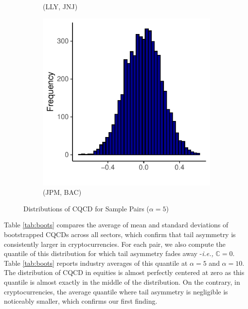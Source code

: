 \documentclass{article}
\begin{document}
\begin{figure}[H]
\begin{subfigure}[b]{0.3\textwidth}
        \caption{(LLY, JNJ)}
        \label{fig:boot-sub2}
    \end{subfigure}
    \begin{subfigure}[b]{0.3\textwidth}
        \includegraphics[width=\textwidth]{Figures/hist_JPM_BAC.pdf}
        \caption{(JPM, BAC)}
        \label{fig:boot-sub3}
    \end{subfigure}
    \caption{Distributions of CQCD  for Sample Pairs ($\alpha =5$)}
    \label{fig:cqds:boot}
\end{figure}



 Table \ref{tab:boots} compares the average of mean and standard deviations of bootstrapped CQCDs across all sectors, which confirm that tail asymmetry is consistently larger in cryptocurrencies. For each pair, we also compute the quantile of this distribution for which tail asymmetry fades away -\textit{i.e.,} $\mathbb{C} = 0$. Table \ref{tab:boots} reports industry averages of this quantile at $\alpha = 5$ and $\alpha = 10$. The distribution of CQCD in equities is almost perfectly centered at zero as this quantile is almost exactly in the middle of the distribution. On the contrary, in cryptocurrencies, the average quantile where tail asymmetry is negligible is noticeably smaller, which confirms our first finding. 
 
\end{document}
